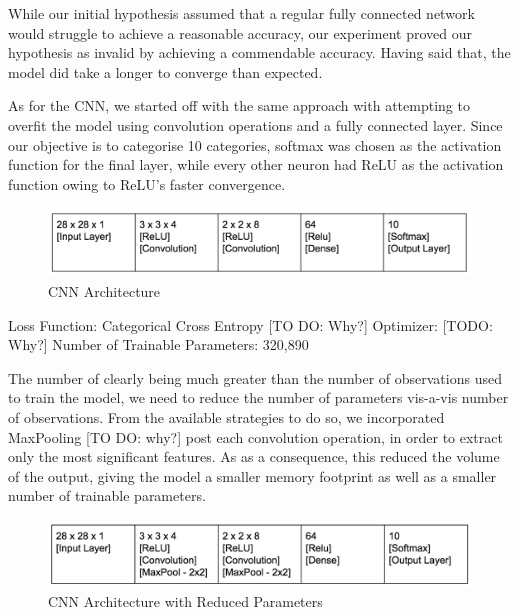 \documentclass[12pt]{article}
\begin{document}
While our initial hypothesis assumed that a regular fully connected network would struggle to achieve a reasonable accuracy, our experiment proved our hypothesis as invalid by achieving a commendable accuracy. Having said that, the model did take a longer to converge than expected.

As for the CNN, we started off with the same approach with attempting to overfit the model using convolution operations and a fully connected layer. Since our objective is to categorise 10 categories, softmax was chosen as the activation function for the final layer, while every other neuron had ReLU as the activation function owing to ReLU’s faster convergence.

\begin{figure}
  \begin{center}
    \includegraphics[scale=0.5]{fig3}
    \end{center}
  \caption{CNN Architecture}
  \label{fig:cnnArch}
\end{figure}

Loss Function: Categorical Cross Entropy [TO DO: Why?]
Optimizer: [TODO: Why?]
Number of Trainable Parameters: 320,890


The number of clearly being much greater than the number of observations used to train the model, we need to reduce the number of parameters vis-a-vis number of observations. From the available strategies to do so, we incorporated MaxPooling [TO DO: why?] post each convolution operation, in order to extract only the most significant features. As as a consequence, this reduced the volume of the output, giving the model a smaller memory footprint as well as a smaller number of trainable parameters.

\begin{figure}
  \begin{center}
    \includegraphics[scale=0.5]{fig4}
  \end{center}
  \caption{CNN Architecture with Reduced Parameters}
  \label{fig:cnnArchPool}
\end{figure}
\end{document}

